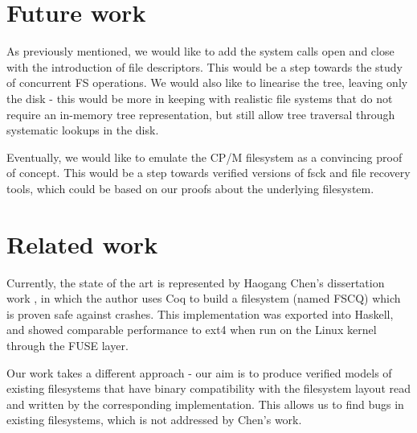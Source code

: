 \documentclass[format=sigconf,review=true]{acmart}
\begin{document}

\section{Future work}
As previously mentioned, we would like to add the system calls open and close with the
introduction of file descriptors. This would be a step towards the
study of concurrent FS operations. We would also like to linearise
the tree, leaving only the disk - this would be more in keeping
with realistic file systems that do not require an in-memory tree
representation, but still allow tree traversal through systematic
lookups in the disk.

Eventually, we would like to emulate the CP/M filesystem as a convincing proof
of concept. This would be a step towards verified versions of fsck
and file recovery tools, which could be based on our proofs about
the underlying filesystem.

\section{Related work}
Currently, the state of the art is represented by Haogang
Chen's dissertation work \cite{DBLP:conf/usenix/ChenZCCKZ16}, in which
the author uses Coq to build a filesystem (named FSCQ) which is proven
safe against crashes. This implementation was exported into Haskell,
and showed comparable performance to ext4 when run on the Linux kernel
through the FUSE layer.

Our work takes a different approach - our aim is to produce verified
models of existing filesystems that have binary compatibility with the
filesystem layout read and written by the corresponding
implementation. This allows us to find bugs in existing filesystems,
which is not addressed by Chen's work.



\end{document}
